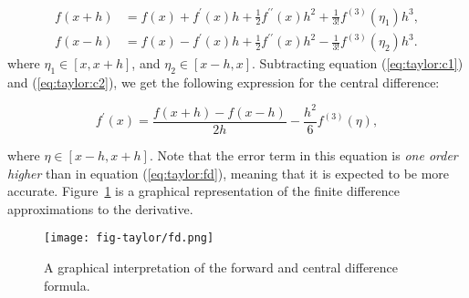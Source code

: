 \documentclass[graybox,sectrefs,envcountresetchap,open=right,final]{svmonodo}
\begin{document}
\begin{align}
f(x+h)&=f(x)+f^\prime(x)h+\frac{1}{2}f^{\prime\prime}(x)h^2+\frac{1}{3!}f^{(3)}(\eta_1)h^3,   
\label{eq:taylor:c1}\\ 
f(x-h)&=f(x)-f^\prime(x)h+\frac{1}{2}f^{\prime\prime}(x)h^2-\frac{1}{3!}f^{(3)}(\eta_2)h^3.
\label{eq:taylor:c2}
\end{align}
where $\eta_1\in[x,x+h]$, and $\eta_2\in[x-h,x]$. Subtracting  equation (\ref{eq:taylor:c1}) and (\ref{eq:taylor:c2}), we get the following expression for the central difference: 

\begin{equation}
f^\prime(x)=\frac{f(x+h)-f(x-h)}{2h} -\frac{h^2}{6}f^{(3)}(\eta),\label{eq:taylor:cd}
\end{equation}

where $\eta\in[x-h,x+h]$. Note that the error term in this equation is \emph{one order higher} than in equation (\ref{eq:taylor:fd}), meaning that it is expected to be more accurate. Figure~\ref{fig:taylor:fd} is a graphical representation of the finite difference approximations to the derivative. 

\begin{figure}[!ht]  %
  \centerline{\texttt{[image: fig-taylor/fd.png]}}
  \caption{
  A graphical interpretation of the forward and central difference formula. \label{fig:taylor:fd}
  }
\end{figure}
\end{document}
